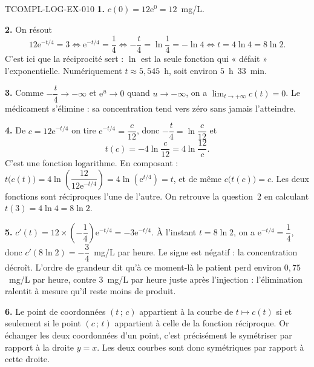\begin{corrige}{TCOMPL-LOG-EX-010}
\textbf{1.} $c(0)=12\mathrm{e}^{0}=12$~mg/L.

\textbf{2.} On résout
\[
  12\mathrm{e}^{-t/4}=3
  \iff \mathrm{e}^{-t/4}=\dfrac14
  \iff -\dfrac t4=\ln\dfrac14=-\ln 4
  \iff t=4\ln 4=8\ln 2.
\]
C'est ici que la réciprocité sert : $\ln$ est la seule fonction qui « défait »
l'exponentielle. Numériquement $t\approx 5{,}545$~h, soit environ $5$~h~$33$~min.

\textbf{3.} Comme $-\dfrac t4\to-\infty$ et $\mathrm{e}^{u}\to 0$ quand
$u\to-\infty$, on a $\displaystyle\lim_{t\to+\infty}c(t)=0$. Le médicament
s'élimine : sa concentration tend vers zéro sans jamais l'atteindre.

\textbf{4.} De $c=12\mathrm{e}^{-t/4}$ on tire $\mathrm{e}^{-t/4}=\dfrac{c}{12}$,
donc $-\dfrac t4=\ln\dfrac{c}{12}$ et
\[
  t(c)=-4\ln\dfrac{c}{12}=4\ln\dfrac{12}{c}.
\]
C'est une fonction logarithme. En composant :
$t\big(c(t)\big)=4\ln\!\left(\dfrac{12}{12\mathrm{e}^{-t/4}}\right)=4\ln\!\left(\mathrm{e}^{t/4}\right)=t$,
et de même $c\big(t(c)\big)=c$. Les deux fonctions sont réciproques l'une de
l'autre. On retrouve la question~2 en calculant $t(3)=4\ln 4=8\ln 2$.

\textbf{5.} $c'(t)=12\times\left(-\dfrac14\right)\mathrm{e}^{-t/4}=-3\mathrm{e}^{-t/4}$.
À l'instant $t=8\ln 2$, on a $\mathrm{e}^{-t/4}=\dfrac14$, donc
$c'(8\ln 2)=-\dfrac34$~mg/L par heure. Le signe est négatif : la concentration
décroît. L'ordre de grandeur dit qu'à ce moment-là le patient perd environ
$0{,}75$~mg/L par heure, contre $3$~mg/L par heure juste après l'injection :
l'élimination ralentit à mesure qu'il reste moins de produit.

\textbf{6.} Le point de coordonnées $(t\,;\,c)$ appartient à la courbe de
$t\mapsto c(t)$ si et seulement si le point $(c\,;\,t)$ appartient à celle de la
fonction réciproque. Or échanger les deux coordonnées d'un point, c'est
précisément le symétriser par rapport à la droite $y=x$. Les deux courbes sont
donc symétriques par rapport à cette droite.
\end{corrige}
